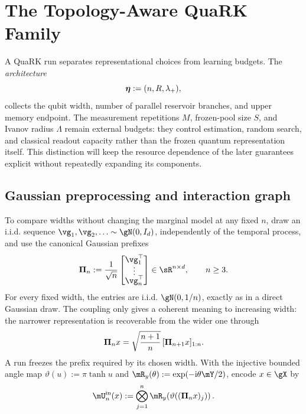 \section{The Topology-Aware QuaRK Family}
\label{sec:quark-family}

A QuaRK run separates representational choices from learning budgets.  The
\emph{architecture}
\[
    \bm{\eta}:=(n,R,\lambda_+),
\]
collects the qubit width, number of parallel reservoir branches, and upper
memory endpoint.  The measurement repetitions $M$, frozen-pool size $S$, and
Ivanov radius $\Lambda$ remain external budgets: they control estimation,
random search, and classical readout capacity rather than the frozen quantum
representation itself.  This distinction will keep the resource dependence of
the later guarantees explicit without repeatedly expanding its components.

\subsection{Gaussian preprocessing and interaction graph}

To compare widths without changing the marginal model at any fixed $n$, draw
an i.i.d. sequence $\vg_1,\vg_2,\ldots\sim\gN(0,I_d)$, independently of the
temporal process, and use the canonical Gaussian prefixes
\begin{equation}
    \projection_n
    :=\frac1{\sqrt n}
      \begin{bmatrix}
        \vg_1^\top\\[-1mm]
        \vdots\\[-1mm]
        \vg_n^\top
      \end{bmatrix}
      \in\sR^{n\times d},
    \qquad n\geq3.
    \label{eq:gaussian-projection}
\end{equation}
For every fixed width, the entries are i.i.d. $\gN(0,1/n)$, exactly as in a
direct Gaussian draw.  The coupling only gives a coherent meaning to
increasing width: the narrower representation is recoverable from the wider
one through
\begin{equation}
    \bm{\Pi}_n x
      =\sqrt{\frac{n+1}{n}}\,
        [\bm{\Pi}_{n+1}x]_{1:n}.
    \label{eq:projection-prefix-recovery}
\end{equation}
A run freezes the prefix required by its chosen width.  With the injective
bounded angle map $\vartheta(u):=\pi\tanh u$ and
$\mR_y(\theta):=\exp(-\ii\theta\pauliY/2)$, encode $x\in\gX$ by
\begin{equation}
    \inputUnitary_n(x)
    :=\bigotimes_{j=1}^n
      \mR_y\!\left(\vartheta((\projection_nx)_j)\right).
    \label{eq:input-encoding}
\end{equation}

